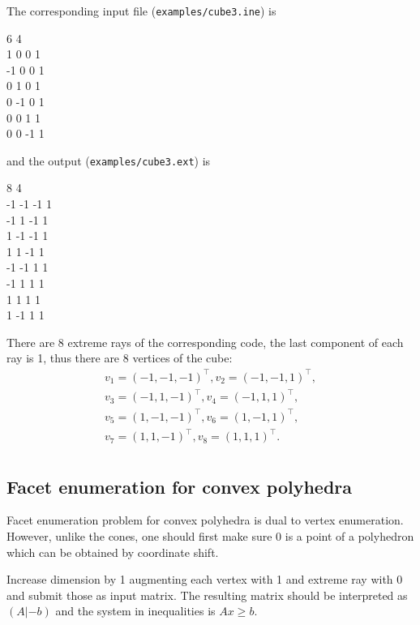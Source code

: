 \documentclass{article}
\newcommand{\transpose}{^{\top}}
\begin{document}
The corresponding input file (\verb$examples/cube3.ine$) is
\begin{adjustwidth}{5cm}{0pt}
6 4 \\
1 0 0 1 \\
-1 0 0 1 \\
0 1 0 1 \\
0 -1 0 1 \\
0 0 1 1 \\
0 0 -1 1
\end{adjustwidth}
and the output (\verb$examples/cube3.ext$) is
\begin{adjustwidth}{5cm}{0pt}
8 4 \\
-1 -1 -1 1 \\
-1 1 -1 1 \\
1 -1 -1 1 \\
1 1 -1 1 \\
-1 -1 1 1 \\
-1 1 1 1 \\
1 1 1 1 \\
1 -1 1 1
\end{adjustwidth}
There are 8 extreme rays of the corresponding code, the last component of each ray is 1, thus there are 8 vertices of the cube:
\begin{align*}
v_1 = (-1, -1, -1)\transpose, v_2 = (-1, -1, 1)\transpose, \\
v_3 = (-1, 1, -1)\transpose, v_4 = (-1, 1, 1)\transpose, \\
v_5 = (1, -1, -1)\transpose, v_6 = (1, -1, 1)\transpose,  \\
v_7 = (1, 1, -1)\transpose, v_8 = (1, 1, 1)\transpose. \\
\end{align*}


\subsection{Facet enumeration for convex polyhedra}\label{sec_PolyhedraFacetEnumeration}

Facet enumeration problem for convex polyhedra is dual to vertex enumeration. However, unlike the cones, one should first make sure 0 is a point of a polyhedron which can be obtained by coordinate shift. 

Increase dimension by 1 augmenting each vertex with 1 and extreme ray with 0 and submit those as input matrix. The resulting matrix should be interpreted as $(A | -b)$ and the system in inequalities is $Ax \geq b$.
\end{document}
